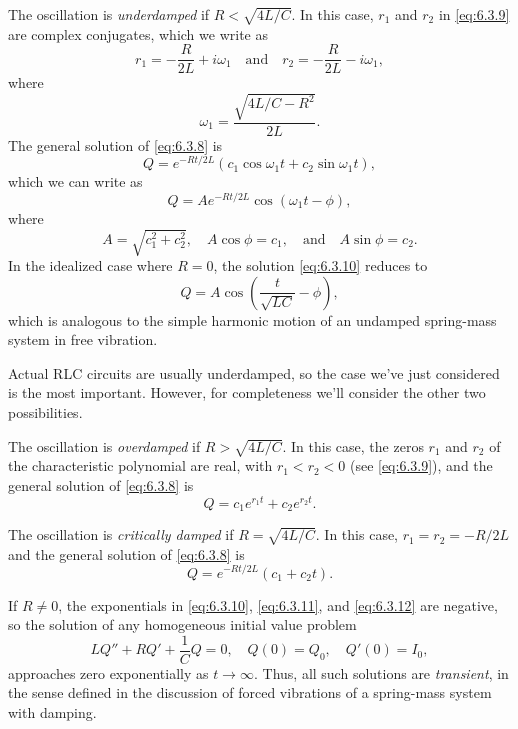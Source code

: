 \begin{enumext}[label=\arabic*,wrap-label={\textsc{Case} #1.},list-indent=0pt,labelwidth=3.5em]
\item
The oscillation is \emph{\color{blue}underdamped} if $R<\sqrt{4L/C}$. In this
case, $r_1$ and $r_2$ in \eqref{eq:6.3.9} are complex conjugates, which we
write as
\[
r_1=-\frac{R}{2L}+i\omega_1\quad\text{and}\quad  r_2=-\frac{R}{2L}-i\omega_1,
\]
where
\[
\omega_1=\frac{\sqrt{4L/C-R^2}}{2L}.
\]
The general solution of  \eqref{eq:6.3.8}  is
\[
Q=e^{-Rt/2L}(c_1\cos\omega_1 t+c_2\sin\omega_1 t),
\]
which we can write as
\begin{equation}\label{eq:6.3.10}
Q=Ae^{-Rt/2L}\cos(\omega_1 t-\phi),
\end{equation}
 where
\[
A=\sqrt{c_1^2+c_2^2},\quad A\cos\phi=c_1,\quad\text{and}\quad  A\sin\phi=c_2.
\]
In the idealized case where $R=0$, the solution \eqref{eq:6.3.10}
reduces to
\[
Q=A\cos\left(\frac{t}{\sqrt{LC}}-\phi\right),
\]
which is analogous to  the simple harmonic motion
of an undamped
spring-mass system in free vibration.

Actual RLC circuits are usually underdamped, so the case we've just
considered is the most important. However, for completeness we'll
consider the other two possibilities.

\item
The oscillation is \emph{\color{blue}overdamped} if $R>\sqrt{4L/C}$. In this case,
the zeros $r_1$ and $r_2$ of the characteristic polynomial are real,
with $r_1<r_2<0$ (see \eqref{eq:6.3.9}), and the general solution of
\eqref{eq:6.3.8} is
\begin{equation}\label{eq:6.3.11}
Q=c_1e^{r_1t}+c_2e^{r_2t}.
\end{equation}

\item
The oscillation is \emph{\color{blue}critically damped} if $R=\sqrt{4L/C}$. In
this case, $r_1=r_2=-R/2L$ and the general solution of \eqref{eq:6.3.8} is
\begin{equation}\label{eq:6.3.12}
Q=e^{-Rt/2L}(c_1+c_2t).
\end{equation}
\end{enumext}

If $R\ne0$, the exponentials in \eqref{eq:6.3.10}, \eqref{eq:6.3.11},
and
\eqref{eq:6.3.12} are negative, so the solution of any homogeneous initial
value problem
\[
 LQ''+RQ'+\frac{1}{C}Q=0,\quad Q(0)=Q_0,\quad Q'(0)=I_0,
\]
approaches zero exponentially as $t\to\infty$. Thus, all such
solutions are \emph{\color{blue}transient}, in the sense defined
 in the discussion of forced vibrations of a
spring-mass system with damping.

